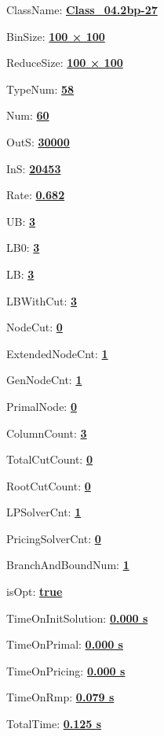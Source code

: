 \documentclass[11pt]{article}
\begin{document}
\pagestyle{empty}


ClassName: \underline{\textbf{Class_04.2bp-27}}
\par
BinSize: \underline{\textbf{100 × 100}}
\par
ReduceSize: \underline{\textbf{100 × 100}}
\par
TypeNum: \underline{\textbf{58}}
\par
Num: \underline{\textbf{60}}
\par
OutS: \underline{\textbf{30000}}
\par
InS: \underline{\textbf{20453}}
\par
Rate: \underline{\textbf{0.682}}
\par
UB: \underline{\textbf{3}}
\par
LB0: \underline{\textbf{3}}
\par
LB: \underline{\textbf{3}}
\par
LBWithCut: \underline{\textbf{3}}
\par
NodeCut: \underline{\textbf{0}}
\par
ExtendedNodeCnt: \underline{\textbf{1}}
\par
GenNodeCnt: \underline{\textbf{1}}
\par
PrimalNode: \underline{\textbf{0}}
\par
ColumnCount: \underline{\textbf{3}}
\par
TotalCutCount: \underline{\textbf{0}}
\par
RootCutCount: \underline{\textbf{0}}
\par
LPSolverCnt: \underline{\textbf{1}}
\par
PricingSolverCnt: \underline{\textbf{0}}
\par
BranchAndBoundNum: \underline{\textbf{1}}
\par
isOpt: \underline{\textbf{true}}
\par
TimeOnInitSolution: \underline{\textbf{0.000 s}}
\par
TimeOnPrimal: \underline{\textbf{0.000 s}}
\par
TimeOnPricing: \underline{\textbf{0.000 s}}
\par
TimeOnRmp: \underline{\textbf{0.079 s}}
\par
TotalTime: \underline{\textbf{0.125 s}}
\par
\newpage
\end{document}
